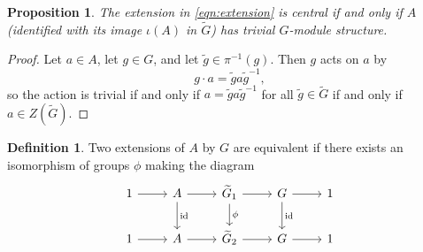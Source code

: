 \documentclass{dcthesis}
\newcommand{\defi}[1]{\textsf{#1}}
\newcommand{\wt}[1]{\widetilde{#1}}
\DeclareMathOperator{\id}{id}
\numberwithin{equation}{section}
\newtheorem{prop}[equation]{Proposition}
\theoremstyle{definition}
\newtheorem{definition}[equation]{Definition}
\theoremstyle{remark}
\begin{document}
{{{\begin{prop}
      The extension in \eqref{eqn:extension}
      is central
      if and only if
      $A$
      (identified with its image $\iota(A)$
      in $\wt{G}$)
      has trivial $G$-module
      structure.
    \end{prop}
    \begin{proof}
      Let $a\in A$, let $g\in G$,
      and let $\wt{g}\in\pi^{-1}(g)$.
      Then $g$ acts on $a$ by
      \begin{equation}
        \label{eqn:gactiontrivial1}
        g\cdot a=\wt{g}a\wt{g}^{-1},
      \end{equation}
      so the action is trivial
      if and only if
      $a=\wt{g}a\wt{g}^{-1}$
      for all $\wt{g}\in\wt{G}$
      if and only if $a\in Z(\wt{G})$.
    \end{proof}
    \begin{definition}
      \label{def:equivalentgroupextension}
      Two extensions of $A$ by $G$ are
      \defi{equivalent}
      if there exists an isomorphism of groups
      $\phi$ making the diagram
      \begin{equation}
        \label{eqn:twoextensions}
        \begin{tikzcd}
          1\arrow{r}&A\arrow{d}{\id}\arrow{r}{}&\wt{G}_1\arrow{r}{}\arrow{d}{\phi}&G\arrow{d}{\id}\arrow{r}&1\\
          1\arrow{r}&A\arrow{r}{}&\wt{G}_2\arrow{r}{}&G\arrow{r}&1

\end{tikzcd}
\end{equation}
\end{definition}}}}
\end{document}
